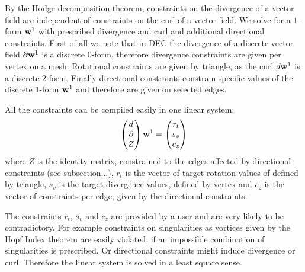  By the Hodge decomposition theorem, constraints on the divergence of a vector field are independent of constraints on the curl of a vector field. We solve for a $1$-form $\textbf{w}^1$ with prescribed divergence and curl and additional directional constraints.
First of all we note that in DEC the divergence of a discrete vector field $\partial \textbf{w}^1$ is a discrete $0$-form, therefore divergence constraints are given per vertex on a mesh. Rotational constraints are given by triangle, as the curl $d\textbf{w}^1$ is a discrete $2$-form. Finally directional constraints constrain specific values of the discrete $1$-form $\textbf{w}^1$ and therefore are given on selected edges.

All the constraints can be compiled easily in one linear system:
\begin{equation}\begin{pmatrix} d \\
\partial \\
Z
\end{pmatrix} \textbf{w}^1
= \begin{pmatrix}
r_t \\
s_v \\
c_z
\end{pmatrix} \label{eq:vfdesign1}
\end{equation}
where $Z$ is the identity matrix, constrained to the edges  affected by directional constraints (see subsection...), $r_t$ is the vector of target rotation values of defined by triangle, $s_v$ is the  target divergence values, defined by vertex and $c_z$ is the vector of constraints per edge, given by the directional constraints.

The constraints $r_t$, $s_v$ and $c_z$ are provided by a user and are very likely to be contradictory. For example constraints on singularities as vortices given by the Hopf Index theorem are easily violated, if an impossible combination of singularities is prescribed. Or directional constraints might induce divergence or curl. Therefore the linear system is solved in a least square sense.

